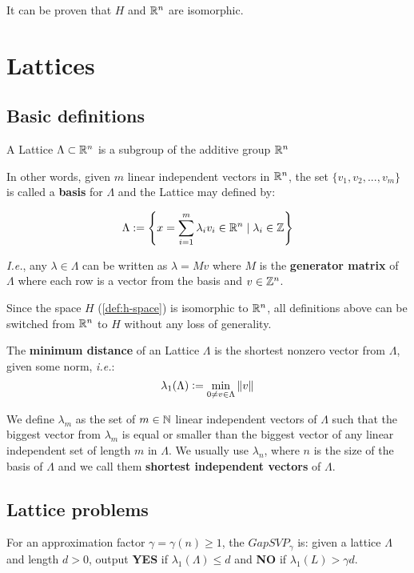 \documentclass[Ingles]{ic-tese-v3}
\begin{document}
It can be proven that \(H\) and \(\mathbb{R}^n\) are isomorphic.
\section{Lattices}
\label{sec:org20ccf62}
\subsection{Basic definitions}
\label{sec:orgca624f4}

   \begin{definition}
  A Lattice $\Lambda \subset \mathbb{R}^n$ is a subgroup of the additive group $\mathbb{R}^n$
\end{definition}

In other words, given \(m\) linear independent vectors in \(\mathbb{R}^n\), the set
\(\{v_1, v_2, ..., v_m\}\) is called a \textbf{basis} for \(\Lambda\) and the Lattice may defined
by:

\begin{definition}
  \begin{equation*}
    \Lambda := \left\{x = \sum_{i=1}^m{\lambda_iv_i} \in \mathbb{R}^n \; | \; \lambda_i \in \mathbb{Z}\right\}
  \end{equation*}

\emph{I.e.}, any $\lambda \in \Lambda$ can be written as $\lambda = Mv$ where $M$ is the
\textbf{generator matrix} of $\Lambda$ where each row is a vector from the basis and
$v \in \mathbb{Z}^n$.
\end{definition}

Since the space \(H\) (\ref{def:h-space}) is isomorphic to \(\mathbb{R}^n\), all definitions above can be switched from \(\mathbb{R}^n\) to \(H\) without any loss of generality.

\begin{definition}
  The \textbf{minimum distance} of an Lattice $\Lambda$ is the shortest nonzero vector
  from $\Lambda$, given some norm, \textit{i.e.}:
  $$
  \lambda_1(\Lambda) \vcentcolon = \min_{0 \ne v \in \Lambda}{\|v\|}
  $$

  We define $\lambda_m$ as the set of $m \in \mathbb{N}$  linear independent vectors of $\Lambda$
  such that the biggest vector from $\lambda_m$ is equal or smaller than the biggest
  vector of any linear independent set of length $m$ in $\Lambda$. We usually use
  $\lambda_n$, where $n$ is the size of the basis of $\Lambda$ and we call them
  \textbf{shortest independent vectors} of $\Lambda$.
\end{definition}

\subsection{Lattice problems}
\label{sec:orgc2caf22}
\begin{definition}
  \label{def:gapsvp}
For an approximation factor $\gamma  = \gamma(n) \geq 1$, the $GapSVP_\gamma $ is: given a lattice
$\Lambda$ and length $d > 0$, output \textbf{YES} if $\lambda_1(\Lambda) \leq d$ and \textbf{NO} if
$\lambda_1(L) > \gamma d$.  
\end{definition}
\end{document}

